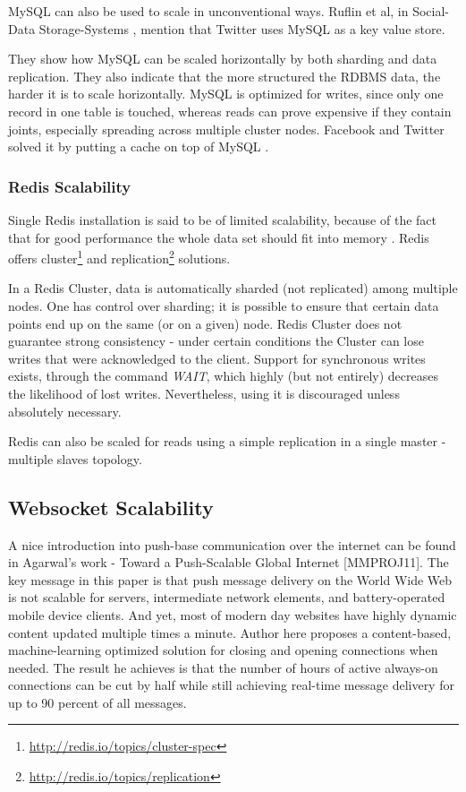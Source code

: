 \documentclass{uvamscse}
\begin{document}
MySQL can also be used to scale in unconventional ways. Ruflin et al, in Social-Data Storage-Systems \cite{SoDaSS}, mention that Twitter uses MySQL as a key value store.

They show how MySQL can be scaled horizontally by both sharding and data replication. They also indicate that the more structured the RDBMS data, the harder it is to scale horizontally. MySQL is optimized for writes, since only one record in one table is touched, whereas reads can prove expensive if they contain joints, especially spreading across multiple cluster nodes. Facebook and Twitter solved it by putting a cache on top of MySQL \cite{SoDaSS}.

\subsubsection{Redis Scalability}
Single Redis installation is said to be of limited scalability, because of the fact that for good performance the whole data set should fit into memory \cite{SoDaSS}. Redis offers cluster\footnote{\url{http://redis.io/topics/cluster-spec}} and replication\footnote{\url{http://redis.io/topics/replication}} solutions.

In a Redis Cluster, data is automatically sharded (not replicated) among multiple nodes. One has control over sharding; it is possible to ensure that certain data points end up on the same (or on a given) node. Redis Cluster does not guarantee strong consistency - under certain conditions the Cluster can lose writes that were acknowledged to the client. Support for synchronous writes exists, through the command \textit{WAIT}, which highly (but not entirely) decreases the likelihood of lost writes. Nevertheless, using it is discouraged unless absolutely necessary.

Redis can also be scaled for reads using a simple replication in a single master - multiple slaves topology.

\subsection{Websocket Scalability}

A nice introduction into push-base communication over the internet can be found in Agarwal’s work - Toward a Push-Scalable Global Internet [MMPROJ11]. The key message in this paper is that push message delivery on the World Wide Web is not scalable for servers, intermediate network elements, and battery-operated mobile device clients. And yet, most of modern day websites have highly dynamic content updated multiple times a minute.
Author here proposes a content-based, machine-learning optimized solution for closing and opening connections when needed. The result he achieves is that the number of hours of active always-on connections can be cut by half while still achieving real-time message delivery for up to 90 percent of all messages.
\end{document}
